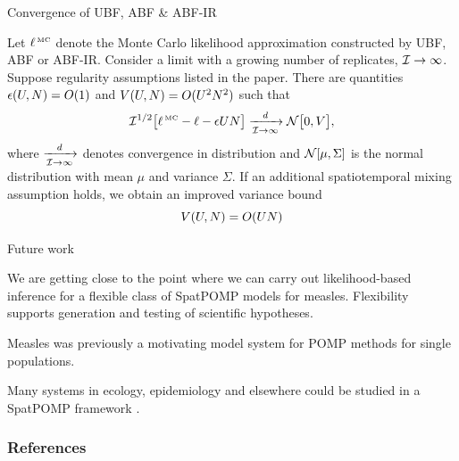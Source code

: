 \documentclass{beamer}
\begin{document}
\begin{frame}{Convergence of UBF, ABF \& ABF-IR \citep{ionides21}}
\begin{theorem}  \label{thm:tif}
Let $\ell^{\,\mbox{\tiny MC}}$ denote the Monte Carlo likelihood approximation constructed by UBF, ABF or ABF-IR.
Consider a limit with a growing number of replicates, $\mathcal{I}\to\infty$.
Suppose regularity assumptions listed in the paper.
There are quantities $\epsilon(U,N) = O(1)$ and $V(U,N)=O(U^2N^2)$ such that
\begin{equation}
\nonumber
\mathcal{I}^{1/2}\big[ \ell^{\,\mbox{\tiny MC}}-\ell-\epsilon UN \big]  \xrightarrow[\mathcal{I} \rightarrow \infty]{d} \mathcal{N}\big[0,V\big],
\end{equation}
where $\xrightarrow[\mathcal{I} \rightarrow \infty]{d}$ denotes convergence in distribution and $\mathcal{N}[\mu,\Sigma]$ is the normal distribution with mean $\mu$ and variance $\Sigma$.
If an additional spatiotemporal mixing assumption holds, we obtain an improved variance bound
\begin{equation}
\nonumber
V(U,N) = O(UN)
\end{equation}
\end{theorem}
\end{frame}

\begin{frame}{Future work}

  \newcommand\futuresep{\vspace{3mm}}
  
  \begin{myitemize}
  \item We are getting close to the point where we can carry out likelihood-based inference for a flexible class of SpatPOMP models for measles.
Flexibility supports generation and testing of scientific hypotheses.
        
    \futuresep
    
  \item Measles was previously a motivating model system for POMP methods for single populations.

    \futuresep
    
    \item Many systems in ecology, epidemiology and elsewhere could be studied in a SpatPOMP framework \citep{bjornstad01}.
    
\end{myitemize}

\end{frame}

\begin{frame}[allowframebreaks]
\frametitle{References}


\end{frame}
\end{document}
